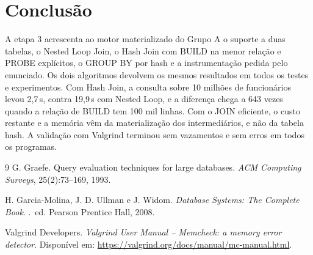 \documentclass[11pt,a4paper]{article}
\begin{document}
\section{Conclusão}
A etapa 3 acrescenta ao motor materializado do Grupo A o suporte a duas tabelas, o Nested Loop Join, o Hash Join com BUILD na menor relação e PROBE explícitos, o GROUP BY por hash e a instrumentação pedida pelo enunciado. Os dois algoritmos devolvem os mesmos resultados em todos os testes e experimentos. Com Hash Join, a consulta sobre 10 milhões de funcionários levou 2,7\,s, contra 19,9\,s com Nested Loop, e a diferença chega a 643 vezes quando a relação de BUILD tem 100 mil linhas. Com o JOIN eficiente, o custo restante e a memória vêm da materialização dos intermediários, e não da tabela hash. A validação com Valgrind terminou sem vazamentos e sem erros em todos os programas.

{\small
\begin{thebibliography}{9}
G. Graefe.
\newblock Query evaluation techniques for large databases.
\newblock \emph{ACM Computing Surveys}, 25(2):73--169, 1993.

H. Garcia-Molina, J. D. Ullman e J. Widom.
\newblock \emph{Database Systems: The Complete Book}.
.\ ed. Pearson Prentice Hall, 2008.

Valgrind Developers.
\newblock \emph{Valgrind User Manual -- Memcheck: a memory error detector}.
\newblock Disponível em: \url{https://valgrind.org/docs/manual/mc-manual.html}.
\end{thebibliography}
}
\end{document}

